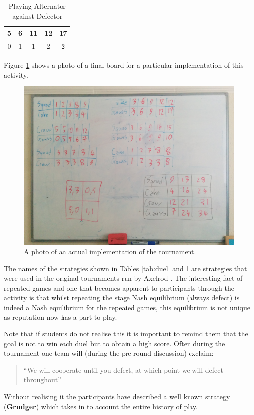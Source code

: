 \documentclass{article}
\begin{document}
\begin{table}[!htbp]
    \caption{Playing Alternator against Defector}
    \centering
    \begin{tabular}{ccccc}
        \toprule
        5&6&11&12&17\\
        \midrule
        0&1&1&2&2\\
        \bottomrule
    \end{tabular}
    \label{tab:duel_1}
\end{table}

Figure \ref{fig:white_board} shows a photo of a final board for a particular
implementation of this activity.

\begin{figure}[!hbtp]
    \centering
    \includegraphics[width=.5\textwidth]{static/white_board.jpg}
    \caption{A photo of an actual implementation of the tournament.}
    \label{fig:white_board}
\end{figure}

The names of the strategies shown in Tables \ref{tab:duel} and \ref{tab:duel_1}
are strategies that were used in the original tournaments run by Axelrod
\cite{Axelrod1980a, Axelrod1980b}. The interesting fact of repeated games and
one that becomes apparent to participants through the activity is that whilst
repeating the stage Nash equilibrium (always defect) is indeed a Nash
equilibrium for the repeated games, this equilibrium is not unique as
reputation now has a part to play.

Note that if students do not realise this it is important to remind them that
the goal is not to win each duel but to obtain a high score. Often during the
tournament one team will (during the pre round discussion) exclaim:

\begin{quote}
   ``We will cooperate until you defect, at which point we will defect
throughout''
\end{quote}

Without realising it the participants have described a well known strategy
(\textbf{Grudger}) which takes in to account the entire history of play.
\end{document}
